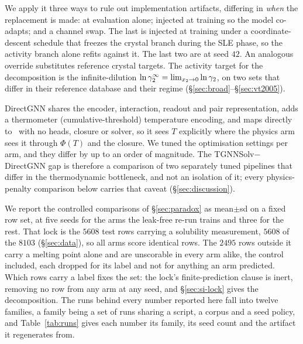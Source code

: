 We apply it three ways
to rule out implementation artifacts, differing in \emph{when} the replacement is made: at
evaluation alone; injected at training so the model co-adapts; and a channel swap. The last is
injected at training under a coordinate-descent schedule that freezes the crystal branch during the
SLE phase, so the activity branch alone refits against it. The last two are at seed $42$. An analogous override
substitutes reference crystal targets. The activity target for the decomposition is the infinite-dilution
$\ln\gamma_2^\infty=\lim_{x_2\to0}\ln\gamma_2$, on two sets that differ in their reference database and their regime
(\S\ref{sec:broad}--\S\ref{sec:vt2005}).

DirectGNN shares the encoder, interaction, readout and pair representation, adds a thermometer
(cumulative-threshold) temperature encoding, and maps directly to \lnx\ with no heads, closure or
solver, so it sees $T$ explicitly where the physics arm sees it through $\Phi(T)$ and the closure.
We tuned the optimisation settings per arm, and they differ by up
to an order of magnitude. The TGNNSolv$-$DirectGNN gap is therefore a comparison of two separately
tuned pipelines that differ in the thermodynamic bottleneck, and not an isolation of it; every
physics-penalty comparison below carries that caveat (\S\ref{sec:discussion}).

We report the controlled comparisons of \S\ref{sec:paradox} as mean$\pm$sd on a fixed row set, at
five seeds for the arms the leak-free re-run trains and three for the rest. That lock is the $5608$
test rows carrying a solubility measurement, $5608$
of the $8103$ (\S\ref{sec:data}), so all arms score identical rows. The $2495$ rows outside it
carry a melting point alone and are unscorable in every arm alike, the control included, each
dropped for its label and not for anything an arm predicted. Which
rows carry a label fixes the set: the lock's finite-prediction clause is
inert, removing no row from any arm at any seed, and \S\ref{sec:si-lock} gives the decomposition. The
runs behind every number reported here fall into twelve families, a family being a set of runs
sharing a script, a corpus and a seed policy, and Table~\ref{tab:runs} gives each number its family, its
seed count and the artifact it regenerates from.


